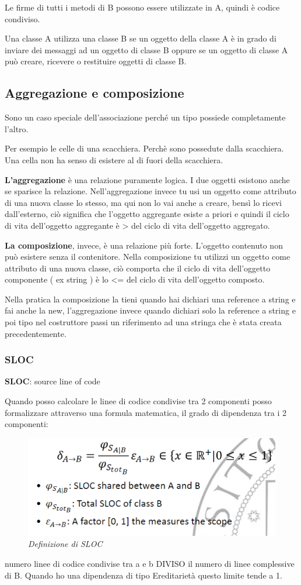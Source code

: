Le firme di tutti i metodi di B possono essere utilizzate in A, quindi è codice condiviso.

Una classe A utilizza una classe B se un oggetto della classe A è in grado di inviare dei messaggi ad un oggetto di classe B oppure se un oggetto di classe A può creare, ricevere o restituire oggetti di classe B.

\subsection{Aggregazione e composizione}
Sono un caso speciale dell’associazione perché un tipo possiede completamente l’altro.

Per esempio le celle di una scacchiera. Perchè sono possedute dalla scacchiera. Una cella non ha senso di esistere al di fuori della scacchiera.

\textbf{L'aggregazione} è una relazione puramente logica. I due oggetti esistono anche se sparisce la relazione. Nell'aggregazione invece tu usi un oggetto come attributo di una nuova classe lo stesso, ma qui non lo vai anche a creare, bensì lo ricevi dall'esterno, ciò significa che l'oggetto aggregante esiste a priori e quindi il ciclo di vita dell'oggetto aggregante è > del ciclo di vita dell'oggetto aggregato.

\textbf{La composizione}, invece, è una relazione più forte. L'oggetto contenuto non può esistere senza il contenitore. Nella composizione tu utilizzi un oggetto come attributo di una nuova classe, ciò comporta che il ciclo di vita dell'oggetto componente ( ex string ) è lo <= del ciclo di vita dell'oggetto composto.

Nella pratica la composizione la tieni quando hai dichiari una reference a string e fai anche la new, l'aggregazione invece quando dichiari solo la reference a string e poi tipo nel costruttore passi un riferimento ad una stringa che è stata creata precedentemente.
\subsubsection{SLOC}

\textbf{SLOC}: source line of code

Quando posso calcolare le linee di codice condivise tra 2 componenti posso formalizzare attraverso una formula matematica, il grado di dipendenza tra i 2 componenti:
\begin{figure}[H]
\includegraphics[scale=0.8]{images/SLOC}
\caption{\textit{Definizione di SLOC} \label{fig:sloc}}
\end{figure}
numero linee di codice condivise tra a e b DIVISO il numero di linee complessive di B. Quando ho una dipendenza di tipo Ereditarietà questo limite tende a 1.

